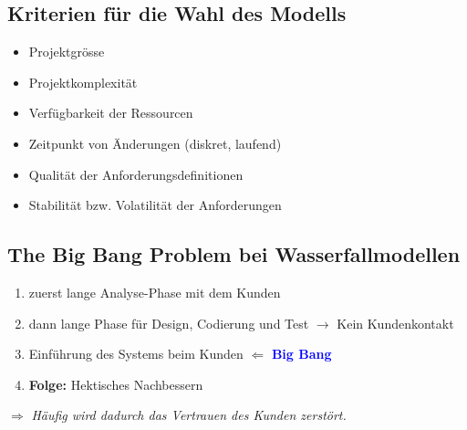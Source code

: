 \begin{multicols}{2}
\subsection{Kriterien für die Wahl des Modells}
\begin{itemize}
	\item Projektgrösse
	\item Projektkomplexität
	\item Verfügbarkeit der Ressourcen
	\item Zeitpunkt von Änderungen (diskret, laufend)
	\item Qualität der Anforderungsdefinitionen
	\item Stabilität bzw. Volatilität der Anforderungen
\end{itemize}

\subsection{The Big Bang Problem bei \newline Wasserfallmodellen}
\begin{enumerate}
	\item zuerst lange Analyse-Phase mit dem Kunden
	\item dann lange Phase für Design, Codierung und Test \newline $\rightarrow$ Kein Kundenkontakt
	\item Einführung des Systems beim Kunden $\Leftarrow$ \textcolor{blue}{\textbf{Big Bang}} 
	\item \textbf{Folge:} Hektisches Nachbessern
\end{enumerate}
$\Rightarrow$ \textit{Häufig wird dadurch das Vertrauen des Kunden zerstört.}
\end{multicols}
\clearpage